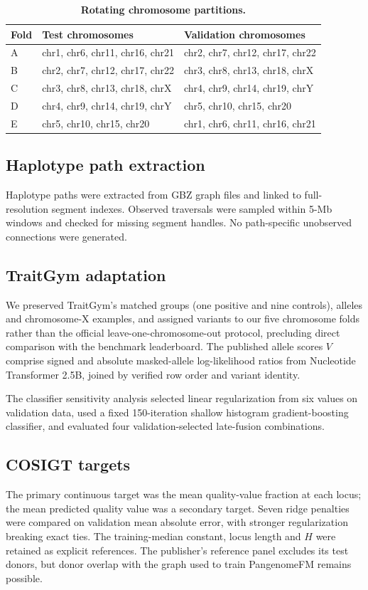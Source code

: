 \documentclass[11pt]{article}
\newcommand{\method}{PangenomeFM\xspace}
\begin{document}
\begin{bibunit}[unsrtnat]
\begin{table}[H]
\centering
\caption{\textbf{Rotating chromosome partitions.}}
\label{S-stab:folds}
\small
\begin{tabularx}{\linewidth}{@{}lXX@{}}
\toprule
Fold & Test chromosomes & Validation chromosomes \\
\midrule
A & chr1, chr6, chr11, chr16, chr21 & chr2, chr7, chr12, chr17, chr22 \\
B & chr2, chr7, chr12, chr17, chr22 & chr3, chr8, chr13, chr18, chrX \\
C & chr3, chr8, chr13, chr18, chrX & chr4, chr9, chr14, chr19, chrY \\
D & chr4, chr9, chr14, chr19, chrY & chr5, chr10, chr15, chr20 \\
E & chr5, chr10, chr15, chr20 & chr1, chr6, chr11, chr16, chr21 \\
\bottomrule
\end{tabularx}
\end{table}

\subsection{Haplotype path extraction}
Haplotype paths were extracted from GBZ graph files\cite{supp__siren2022gbz} and linked to full-resolution segment indexes. Observed traversals were sampled within 5-Mb windows and checked for missing segment handles. No path-specific unobserved connections were generated.

\subsection{TraitGym adaptation}
We preserved TraitGym's matched groups (one positive and nine controls), alleles and chromosome-X examples, and assigned variants to our five chromosome folds rather than the official leave-one-chromosome-out protocol, precluding direct comparison with the benchmark leaderboard. The published allele scores $V$ comprise signed and absolute masked-allele log-likelihood ratios from Nucleotide Transformer 2.5B, joined by verified row order and variant identity.

The classifier sensitivity analysis selected linear regularization from six values on validation data, used a fixed 150-iteration shallow histogram gradient-boosting classifier, and evaluated four validation-selected late-fusion combinations.

\subsection{COSIGT targets}
The primary continuous target was the mean quality-value fraction at each locus; the mean predicted quality value was a secondary target. Seven ridge penalties were compared on validation mean absolute error, with stronger regularization breaking exact ties. The training-median constant, locus length and $H$ were retained as explicit references. The publisher's reference panel excludes its test donors, but donor overlap with the graph used to train \method remains possible.


\end{bibunit}
\end{document}

